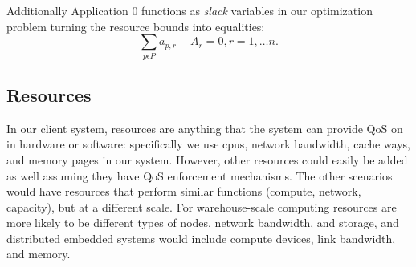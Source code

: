 Additionally Application 0 functions as \emph{slack} variables in our optimization problem turning the resource bounds into equalities:
\begin{equation}
\sum_{p\epsilon P} a_{p,r} - A_r = 0, r = 1,\dots n.
\end{equation}

\subsection*{Resources}

In our client system, resources are anything that the system can provide QoS on in hardware or software: specifically we use cpus, network bandwidth, cache ways, and memory pages in our system.  However, other resources could easily be added as well assuming they have QoS enforcement mechanisms.  The other scenarios would have resources that perform similar functions (compute, network, capacity), but at a different scale. For warehouse-scale computing resources are more likely to be different types of nodes, network bandwidth, and storage, and distributed embedded systems would include compute devices, link bandwidth, and memory.

